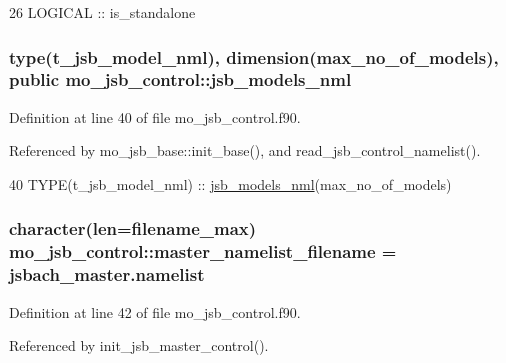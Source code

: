 \begin{DoxyCode}
26   \textcolor{keywordtype}{LOGICAL} :: is\_standalone
\end{DoxyCode}
\hypertarget{namespacemo__jsb__control_a71f0482fffea3f64acb60c7821436357}{}
\subsubsection[{jsb\+\_\+models\+\_\+nml}]{\setlength{\rightskip}{0pt plus 5cm}type(t\+\_\+jsb\+\_\+model\+\_\+nml), dimension({\bf max\+\_\+no\+\_\+of\+\_\+models}), public mo\+\_\+jsb\+\_\+control\+::jsb\+\_\+models\+\_\+nml}\label{namespacemo__jsb__control_a71f0482fffea3f64acb60c7821436357}


Definition at line 40 of file mo\+\_\+jsb\+\_\+control.\+f90.



Referenced by mo\+\_\+jsb\+\_\+base\+::init\+\_\+base(), and read\+\_\+jsb\+\_\+control\+\_\+namelist().


\begin{DoxyCode}
40   \textcolor{keywordtype}{TYPE}(t\_jsb\_model\_nml) :: \hyperlink{namespacemo__jsb__control_a71f0482fffea3f64acb60c7821436357}{jsb\_models\_nml}(max\_no\_of\_models)
\end{DoxyCode}
\hypertarget{namespacemo__jsb__control_aa607eb23b5df0ed6a04c5163cb0cc82f}{}
\subsubsection[{master\+\_\+namelist\+\_\+filename}]{\setlength{\rightskip}{0pt plus 5cm}character(len=filename\+\_\+max) mo\+\_\+jsb\+\_\+control\+::master\+\_\+namelist\+\_\+filename = \textquotesingle{}jsbach\+\_\+master.\+namelist\textquotesingle{}}\label{namespacemo__jsb__control_aa607eb23b5df0ed6a04c5163cb0cc82f}


Definition at line 42 of file mo\+\_\+jsb\+\_\+control.\+f90.



Referenced by init\+\_\+jsb\+\_\+master\+\_\+control().


